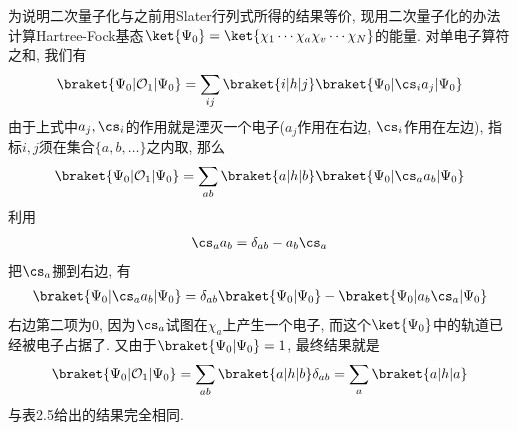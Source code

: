 
为说明二次量子化与之前用Slater行列式所得的结果等价, 
现用二次量子化的办法计算Hartree-Fock基态$\ket{\Psi_0} = \ket{\chi_1\cdots\chi_a\chi_v\cdots\chi_N}$的能量. 
对单电子算符之和, 
我们有
\begin{align}
\braket{\Psi_0|\mathcal{O}_1|\Psi_0} = \sum_{ij}\braket{i|h|j}\braket{\Psi_0|\cs_i a_j|\Psi_{0}}
\end{align}
由于上式中$a_j,\cs_i$的作用就是湮灭一个电子($a_j$作用在右边, 
$\cs_i$作用在左边), 
指标$i,j$须在集合$\{a,b,\ldots\}$之内取, 
那么
\begin{align}
\braket{\Psi_0|\mathcal{O}_1|\Psi_0} = \sum_{ab}\braket{a|h|b}\braket{\Psi_0|\cs_a a_b|\Psi_{0}}
\end{align}
利用
\begin{align}
\cs_a a_b = \delta_{ab} - a_b\cs_a \notag
\end{align}
把$\cs_a$挪到右边, 
有
\begin{align}
\braket{\Psi_0|\cs_a a_b|\Psi_0} = \delta_{ab}\braket{\Psi_0|\Psi_0} - \braket{\Psi_0|a_b\cs_a|\Psi_0}
\end{align}
右边第二项为$0$, 
因为$\cs_a$试图在$\chi_a$上产生一个电子, 
而这个$\ket{\Psi_0}$中的轨道已经被电子占据了. 
又由于$\braket{\Psi_0|\Psi_0} = 1$, 
最终结果就是
\begin{align}
\braket{\Psi_0|\mathcal{O}_1|\Psi_0} = \sum_{ab} \braket{a|h|b}\delta_{ab} = \sum_a\braket{a|h|a}
\end{align} 
与表2.5给出的结果完全相同.


